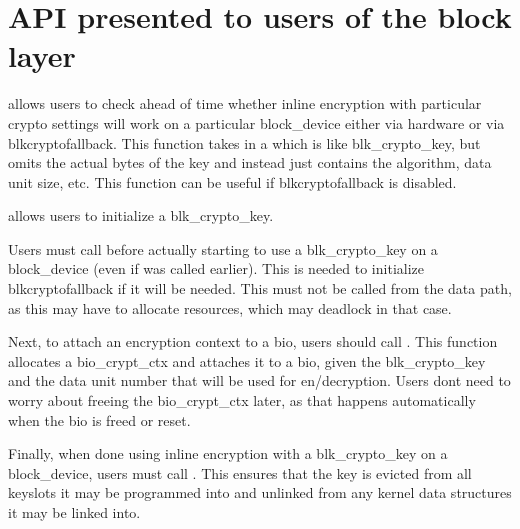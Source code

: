\documentclass[a4paper,11pt,english]{sphinxmanual}
\begin{document}
\section{API presented to users of the block layer}
\label{\detokenize{inline-encryption:api-presented-to-users-of-the-block-layer}}
 allows users to check ahead of time whether
inline encryption with particular crypto settings will work on a particular
block\_device \sphinxhyphen{}\sphinxhyphen{} either via hardware or via blk\sphinxhyphen{}crypto\sphinxhyphen{}fallback.  This function
takes in a  which is like blk\_crypto\_key, but omits
the actual bytes of the key and instead just contains the algorithm, data unit
size, etc.  This function can be useful if blk\sphinxhyphen{}crypto\sphinxhyphen{}fallback is disabled.

 allows users to initialize a blk\_crypto\_key.

Users must call  before actually starting to use
a blk\_crypto\_key on a block\_device (even if 
was called earlier).  This is needed to initialize blk\sphinxhyphen{}crypto\sphinxhyphen{}fallback if it
will be needed.  This must not be called from the data path, as this may have to
allocate resources, which may deadlock in that case.

Next, to attach an encryption context to a bio, users should call
.  This function allocates a bio\_crypt\_ctx and attaches
it to a bio, given the blk\_crypto\_key and the data unit number that will be used
for en/decryption.  Users don\textquotesingle{}t need to worry about freeing the bio\_crypt\_ctx
later, as that happens automatically when the bio is freed or reset.

Finally, when done using inline encryption with a blk\_crypto\_key on a
block\_device, users must call .  This ensures that
the key is evicted from all keyslots it may be programmed into and unlinked from
any kernel data structures it may be linked into.
\end{document}
